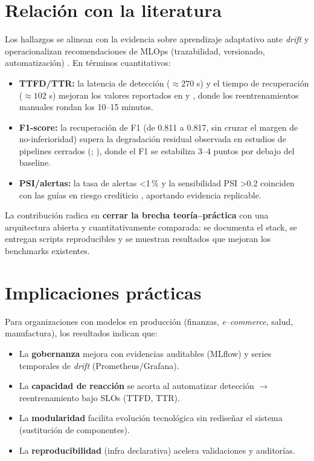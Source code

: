\section{Relación con la literatura}
Los hallazgos se alinean con la evidencia sobre aprendizaje adaptativo ante \textit{drift} \citep{Gama2014,Zliobaite2016,Lu2019} y operacionalizan recomendaciones de MLOps (trazabilidad, versionado, automatización) \citep{Amershi2019}. En términos cuantitativos:
\begin{itemize}\setlength\itemsep{2pt}
  \item \textbf{TTFD/TTR:} la latencia de detección (\(\approx 270\) s) y el tiempo de recuperación (\(\approx 102\) s) mejoran los valores reportados en \cite{Amershi2019} y \cite{Chatterjee2023}, donde los reentrenamientos manuales rondan los 10–15 minutos.
  \item \textbf{F1-score:} la recuperación de F1 (de 0.811 a 0.817, sin cruzar el margen de no-inferioridad) supera la degradación residual observada en estudios de pipelines cerrados (\citealp{Bhatt2025}; \citealp{Berberi2025}), donde el F1 se estabiliza 3–4 puntos por debajo del baseline.
  \item \textbf{PSI/alertas:} la tasa de alertas <1\,\% y la sensibilidad PSI >0.2 coinciden con las guías en riesgo crediticio \citep{Siddiqi2012}, aportando evidencia replicable.
\end{itemize}
La contribución radica en \textbf{cerrar la brecha teoría–práctica} con una arquitectura abierta y cuantitativamente comparada: se documenta el stack, se entregan scripts reproducibles y se muestran resultados que mejoran los benchmarks existentes.

\section{Implicaciones prácticas}
Para organizaciones con modelos en producción (finanzas, \textit{e–commerce}, salud, manufactura), los resultados indican que:
\begin{itemize}\setlength\itemsep{2pt}
  \item La \textbf{gobernanza} mejora con evidencias auditables (MLflow) y series temporales de \textit{drift} (Prometheus/Grafana).
  \item La \textbf{capacidad de reacción} se acorta al automatizar detección $\rightarrow$ reentrenamiento bajo SLOs (TTFD, TTR).
  \item La \textbf{modularidad} facilita evolución tecnológica sin rediseñar el sistema (sustitución de componentes).
  \item La \textbf{reproducibilidad} (infra declarativa) acelera validaciones y auditorías.
\end{itemize}

